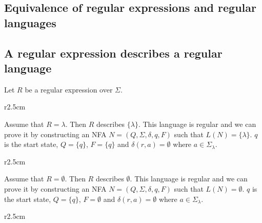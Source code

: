 \documentclass{article}
\newcommand{\emptyString}{\lambda}
\begin{document}
\pagebreak

\subsection{Equivalence of regular expressions and regular languages}

\subsection{A regular expression describes a regular language}

Let \(R\) be a regular expression over \(\Sigma\).

\begin{wrapfigure}{r}{2.5cm}
\end{wrapfigure}

Assume that \(R=\emptyString\). Then \(R\) describes \(\{\emptyString\}\).
This language is regular and we can prove it by constructing an NFA \(N=(Q, \Sigma, \delta, q, F)\)
such that \(L(N)=\{\emptyString\}\).
\(q\) is the start state, \(Q=\{q\}\), \(F=\{q\}\) and \(\delta(r,a)=\emptyset\)
where \(a\in\Sigma_\emptyString\).
\wrapfill

\begin{wrapfigure}{r}{2.5cm}
\end{wrapfigure}

Assume that \(R=\emptyset\). Then \(R\) describes \(\emptyset\).
This language is regular and we can prove it by constructing an NFA \(N=(Q, \Sigma, \delta, q, F)\)
such that \(L(N)=\emptyset\).
\(q\) is the start state, \(Q=\{q\}\), \(F=\emptyset\) and \(\delta(r,a)=\emptyset\) where \(a\in\Sigma_\emptyString\).
\wrapfill

\begin{wrapfigure}{r}{2.5cm}
\end{wrapfigure}
\end{document}

